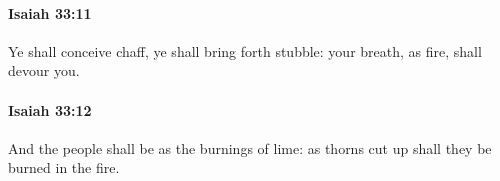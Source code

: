 		\paragraph{Isaiah 33:11} %
			\label{ISAIAH-33-11}

			Ye shall conceive chaff, ye shall bring forth stubble: your breath, as fire, shall devour you.


		\paragraph{Isaiah 33:12} %
			\label{ISAIAH-33-12}

			And the people shall be as the burnings of lime: as thorns cut up shall they be burned in the fire.


